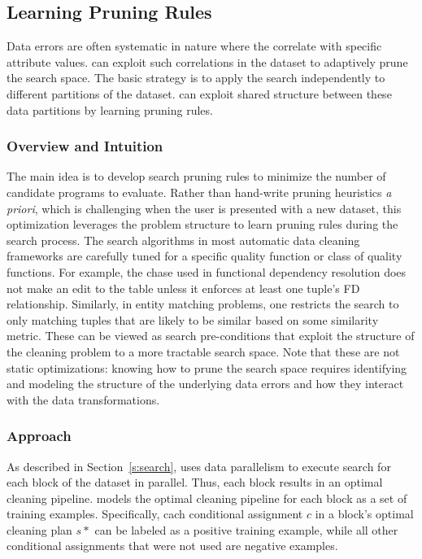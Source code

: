 \subsection{Learning Pruning Rules}\label{s:pruning}
 Data errors are often systematic in nature where the correlate with specific attribute values.
\sys can exploit such correlations in the dataset to adaptively prune the search space.
The basic strategy is to apply the search independently to different partitions of the dataset.
\sys can exploit shared structure between these data partitions by learning pruning rules.


\subsubsection{Overview and Intuition}\label{s:dynlearn}
The main idea is to develop search pruning rules to minimize the number of candidate programs to evaluate.  Rather than hand-write pruning heuristics {\it a priori}, which is challenging when the user is presented with a new dataset, this optimization leverages the problem structure to learn pruning rules during the search process.
The search algorithms in  most automatic data cleaning frameworks are carefully tuned for a specific quality function or class of quality functions. For example, the chase used in functional dependency resolution does not make an edit to the table unless it enforces at least one tuple's FD relationship.    Similarly, in entity matching problems, one restricts the search to only matching tuples that are likely to be similar based on some similarity metric.
These can be viewed as search pre-conditions that exploit the structure of the cleaning problem to a more tractable search space.
Note that these are not static optimizations: knowing how to prune the search space requires identifying and modeling the structure of the underlying data errors and how they interact with the data transformations.


\subsubsection{Approach}
As described in Section~\ref{s:search}, \sys uses data parallelism to execute search for each block of the dataset in parallel.  Thus, each block results in an optimal cleaning pipeline.  \sys models the optimal cleaning pipeline for each block as a set of training examples.  Specifically, cach conditional assignment $c$ in a block's optimal cleaning plan $s*$ can be labeled as a positive training example, while all other conditional assignments that were not used are negative examples.  


